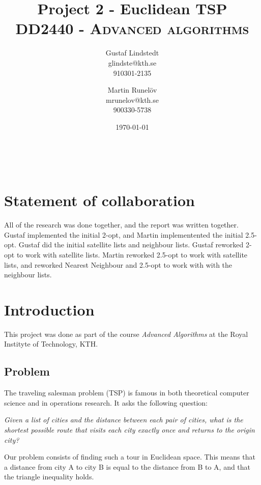\documentclass[paper=a4, fontsize=11pt,numbers=endperiod]{scrartcl} %
\title{ 
\huge Project 2 - Euclidean TSP \\ %
\vspace{10pt}
\normalfont \normalsize 
\textsc{DD2440 - Advanced algorithms } \\ [25pt] %
}
\author{Gustaf Lindstedt \\ glindste@kth.se \\ 910301-2135 \and Martin Runelöv \\ mrunelov@kth.se \\ 900330-5738}
\date{\vspace{8pt}\normalsize\today} %
\numberwithin{equation}{section} %
\numberwithin{figure}{section} %
\numberwithin{table}{section} %
\begin{document}
\maketitle %


\hspace{0pt}\\
\section*{Statement of collaboration}
All of the research was done together, and the report was written together.
Gustaf implemented the initial 2-opt, and Martin implementented the initial 2.5-opt.
Gustaf did the initial satellite lists and neighbour lists. Gustaf reworked 2-opt to work with satellite lists.
Martin reworked 2.5-opt to work with satellite lists, and reworked Nearest Neighbour and 2.5-opt to work with with the neighbour lists.

\section{Introduction}

This project was done as part of the course \emph{Advanced Algorithms} at the Royal Instityte of Technology, KTH.

\subsection{Problem}

The traveling salesman problem (TSP) is famous in both theoretical computer science and in operations research. It asks the following question: 

\begin{center}
    \emph{Given a list of cities and the distance between each pair of cities, what is the shortest possible route that visits each city exactly once and returns to the origin city?}
\end{center}

Our problem consists of finding such a tour in Euclidean space. This means that a distance from city A to city B is equal to the distance from B to A, and that the triangle inequality holds.

\end{document}
